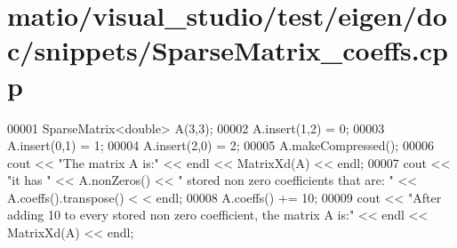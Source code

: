 \hypertarget{matio_2visual__studio_2test_2eigen_2doc_2snippets_2_sparse_matrix__coeffs_8cpp_source}{}\section{matio/visual\+\_\+studio/test/eigen/doc/snippets/\+Sparse\+Matrix\+\_\+coeffs.cpp}
\label{matio_2visual__studio_2test_2eigen_2doc_2snippets_2_sparse_matrix__coeffs_8cpp_source}

\begin{DoxyCode}
00001 SparseMatrix<double> A(3,3);
00002 A.insert(1,2) = 0;
00003 A.insert(0,1) = 1;
00004 A.insert(2,0) = 2;
00005 A.makeCompressed();
00006 cout << \textcolor{stringliteral}{"The matrix A is:"} << endl << MatrixXd(A) << endl;
00007 cout << \textcolor{stringliteral}{"it has "} << A.nonZeros() << \textcolor{stringliteral}{" stored non zero coefficients that are: "} << A.coeffs().transpose() <
      < endl;
00008 A.coeffs() += 10;
00009 cout << \textcolor{stringliteral}{"After adding 10 to every stored non zero coefficient, the matrix A is:"} << endl << MatrixXd(A) << 
      endl;
\end{DoxyCode}
